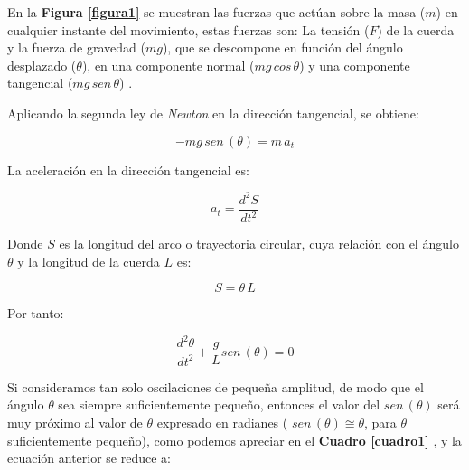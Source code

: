 \documentclass[letter,11pt]{article}
\begin{document}
En la \textbf{Figura \ref{figura1}} se muestran las fuerzas que actúan sobre la
masa ($m$) en cualquier instante del movimiento, estas fuerzas son: La tensión
($F$) de la cuerda y la fuerza de gravedad ($mg$), que se descompone en función
del ángulo desplazado ($\theta$), en una componente normal ($mg\, cos\, \theta$)
y una componente tangencial ($mg\, sen\, \theta$) \cite{GUIA}.

Aplicando la segunda ley de \emph{Newton} en la dirección tangencial, se
obtiene:

\begin{equation*}
    -mg\, sen\, (\theta) = m\, a_t
\label{segundaley}
\end{equation*}
\vspace{-0.16cm}

La aceleración en la dirección tangencial es:

\begin{equation*}
    a_t = \frac{d^2 S}{dt^2}
\end{equation*}
\vspace{-0.16cm}

Donde $S$ es la longitud del arco o trayectoria circular, cuya relación con el
ángulo $\theta$ y la longitud de la cuerda $L$ es:

\begin{equation*}
    S = \theta\, L
\end{equation*}
\vspace{-0.16cm}

Por tanto:

\begin{equation*}
    \frac{d^2 \theta}{dt^2} + \frac{g}{L} sen\, (\theta) = 0
\end{equation*}
\vspace{-0.16cm}

Si consideramos tan solo oscilaciones de pequeña amplitud, de modo que el
ángulo $\theta$ sea siempre suficientemente pequeño, entonces el valor del
$sen\, (\theta)$ será muy próximo al valor de $\theta$ expresado en radianes (
$sen\, (\theta) \cong \theta$, para $\theta$ suficientemente pequeño), como podemos
apreciar en el \textbf{Cuadro \ref{cuadro1}} \cite{WIKI1}, y la ecuación
anterior se reduce a:
\end{document}
